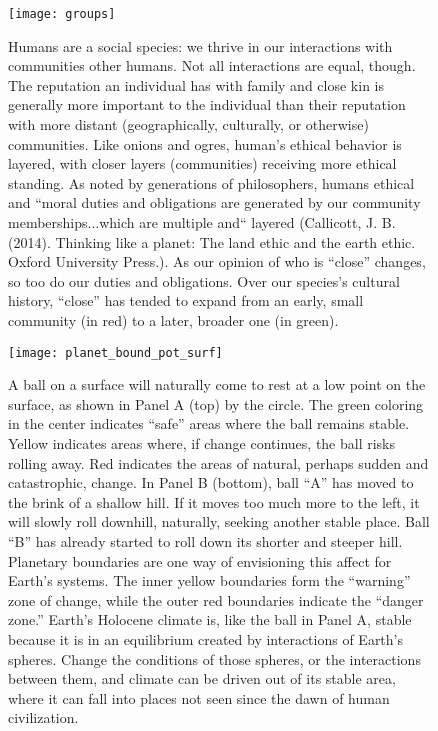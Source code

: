 \newpage
\begin{figure}[p]
\centering
  \texttt{[image: groups]}%
\caption{Humans are a social species: we thrive in our interactions with communities other humans. Not all interactions are equal, though. The reputation an individual has with family and close kin is generally more important to the individual than their reputation with more distant (geographically, culturally, or otherwise) communities. Like onions and ogres, human's ethical behavior is layered, with closer layers (communities) receiving more ethical standing. As noted by generations of philosophers, humans ethical and  ``moral duties and obligations are generated by our community memberships...which are multiple and`` layered (Callicott, J. B. (2014). Thinking like a planet: The land ethic and the earth ethic. Oxford University Press.). As our opinion of who is ``close'' changes, so too do our duties and obligations. Over our species's cultural history, ``close'' has tended to expand from an early, small community (in red) to a later, broader one (in green).}
\label{fig:groups}
\end{figure}


\newpage
\begin{figure}[p]
\centering
  \texttt{[image: planet\_bound\_pot\_surf]}%

\caption{A ball on a surface will naturally come to rest at a low point on the surface, as shown in Panel A (top) by the circle. The green coloring in the center indicates ``safe'' areas where the ball remains stable. Yellow indicates areas where, if change continues, the ball risks rolling away. Red indicates the areas of natural, perhaps sudden and catastrophic, change.  In Panel B (bottom), ball ``A'' has moved to the brink of a shallow hill. If it moves too much more to the left, it will slowly roll downhill, naturally, seeking another stable place. Ball ``B'' has already started to roll down its shorter and steeper hill.  Planetary boundaries are one way of envisioning this affect for Earth's systems. The inner yellow boundaries form the ``warning'' zone of change, while the outer red boundaries indicate the ``danger zone.'' Earth's Holocene climate is, like the ball in Panel A, stable because it is in an equilibrium created by interactions of Earth's spheres. Change the conditions of those spheres, or the interactions between them, and climate can be driven out of its stable area, where it can fall into places not seen since the dawn of human civilization.}
\label{fig:planet_bound_pot_surf}
\end{figure}

